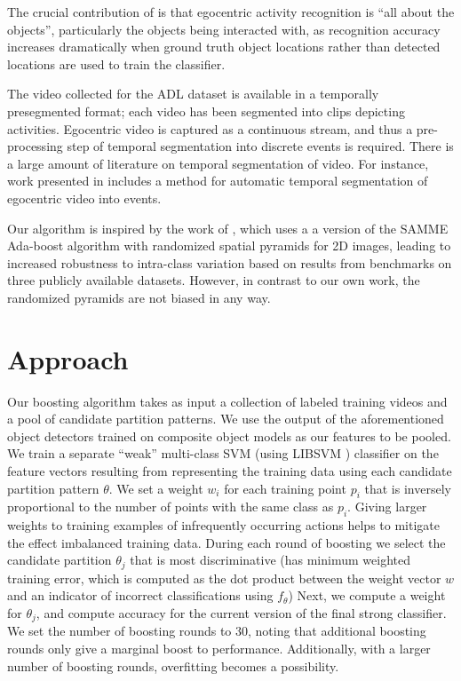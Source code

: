 \documentclass[10pt,twocolumn,letterpaper]{article}
\begin{document}
	The crucial contribution of
	\cite{Ramanan12} is that egocentric activity recognition is ``all about
	the objects'', particularly the objects being interacted with, as
	recognition accuracy increases dramatically when ground truth object
	locations rather than detected locations are used to train the classifier. 

	The video collected for the ADL dataset is available in a temporally
	presegmented format; each video has been segmented into clips depicting
	activities. Egocentric video is captured as a continuous stream, and thus
  a pre-processing step of temporal segmentation into discrete events is
  required. There is a large amount of literature on temporal segmentation
  of video. For instance, work presented in \cite{Lee12} includes a method for
	automatic temporal segmentation of egocentric video into events.
  
	Our algorithm is inspired by the work of \cite{Jiang12}, which uses a
  a version of the SAMME Ada-boost algorithm \cite{Zhu06}
  with randomized spatial pyramids for 2D images, 
	leading to increased robustness to intra-class variation based on results
  from benchmarks on three publicly available datasets. However, in contrast
  to our own work, the randomized pyramids are not biased in any way. 
	

\section{Approach}

	Our boosting algorithm takes as input a collection of labeled training videos
	and a pool of candidate partition patterns. We use the output of the
  aforementioned object detectors trained on composite object models as our features to be
  pooled.
  We train a separate ``weak''
  multi-class SVM 
  (using LIBSVM \cite{Chang11})
	classifier on the feature vectors resulting from representing the training
	data using each candidate partition pattern $\theta$. We set a weight
  $w_i$ for each
	training point $p_i$ that is inversely proportional to the number of points
	with the same class as $p_i$. Giving larger weights to training examples of
  infrequently occurring actions helps to mitigate the effect imbalanced
  training data.
  During each round of boosting we select the
	candidate partition $\theta_j$ that is most discriminative (has minimum
  weighted training
	error, which is computed as the dot product between the weight vector $w$
  and an indicator of incorrect classifications using $f_\theta$)
  Next, we compute a weight for $\theta_j$, and compute accuracy for the
	current version of the final strong classifier. 
	We set the number of boosting rounds to 30, noting that additional boosting
	rounds only give a marginal boost to performance. Additionally, with a
	larger number of boosting rounds, overfitting becomes a possibility.\\
\end{document}
